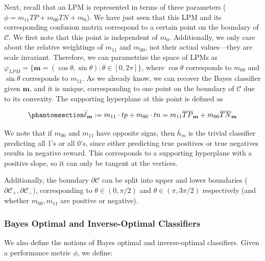 \documentclass[
  letterpaper,
  numbers=noenddot,
  DIV=11]{scrreprt}
\theoremstyle{definition}
\theoremstyle{plain}
\theoremstyle{plain}
\theoremstyle{remark}
\begin{document}
Next, recall that an LPM is represented in terms of three parameters
(\(\phi = m_{11}TP + m_{00}TN + m_0\)). We have just seen that this LPM
and its corresponding confusion matrix correspond to a certain point on
the boundary of \(\mathcal{C}\). We first note that this point is
independent of \(m_0\). Additionally, we only care about the relative
weightings of \(m_{11}\) and \(m_{00}\), not their actual values---they
are scale invariant. Therefore, we can parametrize the space of LPMs as
\(\varphi_{LPM} = \{\mathbf{m} = (\cos \theta, \sin \theta) : \theta \in [0, 2\pi]\}\),
where \(\cos \theta\) corresponds to \(m_{00}\) and \(\sin \theta\)
corresponds to \(m_{11}\). As we already know, we can recover the Bayes
classifier given \(\mathbf{m}\), and it is unique, corresponding to one
point on the boundary of \(\mathcal{C}\) due to its convexity. The
supporting hyperplane at this point is defined as

\begin{equation}\phantomsection\label{eq-eq3.47}{\bar{\ell}_{\mathbf{m}} := m_{11} \cdot tp + m_{00} \cdot tn = m_{11} \overline{TP}_{\mathbf{m}} + m_{00} \overline{TN}_{\mathbf{m}}}\end{equation}

We note that if \(m_{00}\) and \(m_{11}\) have opposite signs, then
\(\bar{h}_m\) is the trivial classifier predicting all 1's or all 0's,
since either predicting true positives or true negatives results in
negative reward. This corresponds to a supporting hyperplane with a
positive slope, so it can only be tangent at the vertices.

Additionally, the boundary \(\partial \mathcal{C}\) can be split into
upper and lower boundaries
(\(\partial \mathcal{C}_{+}, \partial \mathcal{C}_{-}\)), corresponding
to \(\theta \in (0, \pi/2)\) and \(\theta \in (\pi, 3\pi/2)\)
respectively (and whether \(m_{00}, m_{11}\) are positive or negative).

\subsubsection*{Bayes Optimal and Inverse-Optimal
Classifiers}\label{bayes-optimal-and-inverse-optimal-classifiers}

We also define the notions of Bayes optimal and inverse-optimal
classifiers. Given a performance metric \(\phi\), we define:
\end{document}
